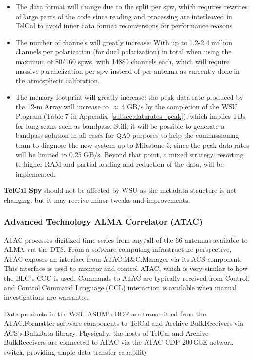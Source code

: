 \begin{itemize}[itemsep=-0.5em]
    \item The data format will change due to the split per \ac{spw}, which requires rewrites of large parts of the code since reading and processing are interleaved in TelCal to avoid inner data format reconversions for performance reasons.
    \item The number of channels will greatly increase: With up to 1.2-2.4 million channels per polarization (for dual polarization) in total when using the maximum of 80/160 spws, with 14880 channels each, which will require massive parallelization per spw instead of per antenna as currently done in the atmospheric calibration.
    \item The memory footprint will greatly increase: the peak data rate produced by the 12-m Array will increase to $\approx$\,4 GB/s by the completion of the WSU Program (Table 7 in Appendix~\ref{subsec:datarates_peak}), which implies TBs for long scans such as bandpass. Still, it will be possible to generate a bandpass solution in all cases for QA0 purposes to help the commissioning team to diagnose the new system up to Milestone 3, since the peak data rates will be limited to 0.25 GB/s. Beyond that point, a mixed strategy, resorting to higher RAM and partial loading and reduction of the data, will be implemented.
\end{itemize}

\textbf{TelCal Spy} should not be affected by WSU as the metadata structure is not changing, but it may receive minor tweaks and improvements.

\subsubsection{Advanced Technology ALMA Correlator (ATAC)}
\ac{ATAC} processes digitized time series from any/all of the 66 antennas available to ALMA via the \ac{DTS}. From a software computing infrastructure perspective, ATAC exposes an interface from ATAC.M\&C.Manager via its \ac{ACS} component. This interface is used to monitor and control ATAC, which is very similar to how the BLC's CCC is used. Commands to ATAC are typically received from Control, and Control Command Language (CCL) interaction is available when manual investigations are warranted.

Data products in the WSU \ac{ASDM}'s \ac{BDF} are transmitted from the ATAC.Formatter software components to TelCal and Archive BulkReceivers via ACS's BulkData library. Physically, the hosts of TelCal and Archive BulkReceivers are connected to ATAC via the ATAC CDP 200\,GbE network switch, providing ample data transfer capability.

